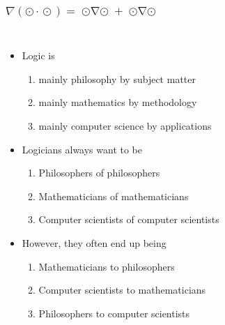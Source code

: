 \documentclass[UTF8,11pt,colorlinks,compress,openany]{beamer}%
\begin{document}
\begin{frame}\frametitle{$\nabla(\odot\!\cdot\!\odot)=\operatorname{\odot\nabla\odot}+\operatorname{\odot\nabla\odot}$}
\begin{columns}
	\Large{
		\begin{itemize}
			\item Logic is
			\begin{enumerate}
				\item mainly philosophy by subject matter
				\item mainly mathematics by methodology
				\item mainly computer science by applications
			\end{enumerate}
			\item Logicians always want to be
			\begin{enumerate}
				\item Philosophers of philosophers
				\item Mathematicians of mathematicians
				\item Computer scientists of computer scientists
			\end{enumerate}
			\item However, they often end up being
			\begin{enumerate}
				\item Mathematicians to philosophers
				\item Computer scientists to mathematicians
				\item Philosophers to computer scientists
			\end{enumerate}
	\end{itemize}}
\end{columns}
\end{frame}
\end{document}
